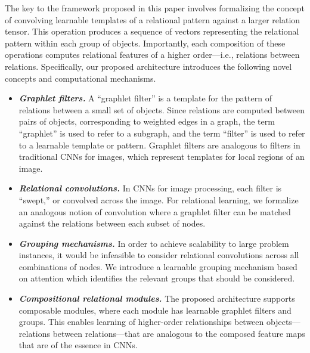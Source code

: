 The key to the framework proposed in this paper involves formalizing the concept of convolving 
learnable templates of a relational pattern against a larger relation tensor. This operation produces a sequence of vectors representing the relational pattern within each group of objects. Importantly, each composition of these operations computes relational features of a higher order---i.e., relations between relations.
Specifically, our proposed architecture introduces the 
following novel concepts and computational mechanisms.
\begin{itemize}
    \item \textit{\bfseries Graphlet filters.} A ``graphlet filter'' is a template for the pattern of relations between a small set of objects. Since relations are computed between pairs of objects, corresponding to weighted edges in a graph, the term ``graphlet'' is used to refer to a subgraph, and the term ``filter'' is used to refer to a learnable template or pattern. Graphlet filters are analogous to filters in traditional CNNs for images, which represent templates for local regions of an image.
    \item \textit{\bfseries Relational convolutions.} In CNNs for image processing, each filter is ``swept,'' or convolved across the image. For relational learning, we formalize an analogous notion of convolution where a graphlet filter can be matched against the relations between each subset of nodes.
    \item \textit{\bfseries Grouping mechanisms.} In order to achieve scalability to large problem instances, it would be infeasible to consider relational convolutions across all combinations of nodes. We introduce a learnable grouping mechanism based on attention which identifies the relevant groups that should be considered. %
    \item \textit{\bfseries Compositional relational modules.} The proposed architecture supports composable modules, where each module has learnable graphlet filters and groups. This enables learning of higher-order relationships between objects---relations between relations---that are analogous to the composed feature maps that are of the essence in CNNs.
\end{itemize}


